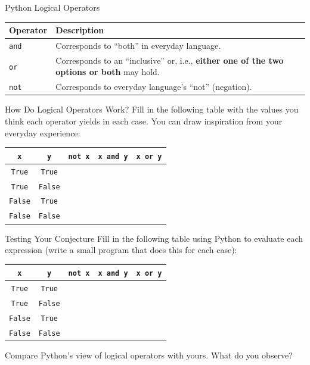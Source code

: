\documentclass[aspectratio=169, 12pt, xcolor=table]{beamer}
\begin{document}
	\begin{frame}{Python Logical Operators}
		\centering
		\begin{tabular}{lp{}}
			\toprule%
			\textbf{Operator} & \textbf{Description}\\\midrule%
			\texttt{and} & Corresponds to ``both'' in everyday language.\\%
			\texttt{or} & Corresponds to an ``inclusive'' or, i.e., \textbf{either one of the two options or both} may hold.\\%
			\texttt{not} & Corresponds to everyday language's ``not'' (negation).\\%
			\bottomrule
		\end{tabular}
	\end{frame}

	\begin{frame}{How Do Logical Operators Work?}
		Fill in the following table with the values you think each operator yields in each case. You can draw inspiration from your everyday experience:
		\vfill
		\centering{}%
		\setlength{\tabcolsep}{14pt}
		\begin{tabular}{ccccc}
			\toprule
			\texttt{x} & \texttt{y} & \texttt{\textbf{not} x} & \texttt{x \textbf{and} y} & \texttt{x \textbf{or} y}\\\midrule
			\texttt{True} & \texttt{True} & & & \\
			\texttt{True} & \texttt{False} & & & \\
			\texttt{False} & \texttt{True} & & & \\
			\texttt{False} & \texttt{False} & & & \\%
			\bottomrule
		\end{tabular}
		\vfill
	\end{frame}

	\begin{frame}{Testing Your Conjecture}
		Fill in the following table using Python to evaluate each expression (write a small program that does this for each case):
		\vfill
		\centering{}%
		\setlength{\tabcolsep}{14pt}
		\begin{tabular}{ccccc}
			\toprule
			\texttt{x} & \texttt{y} & \texttt{\textbf{not} x} & \texttt{x \textbf{and} y} & \texttt{x \textbf{or} y}\\\midrule
			\texttt{True} & \texttt{True} & & & \\
			\texttt{True} & \texttt{False} & & & \\
			\texttt{False} & \texttt{True} & & & \\
			\texttt{False} & \texttt{False} & & & \\%
			\bottomrule
		\end{tabular}
		\vfill
		\raggedright
		Compare Python's view of logical operators with yours. What do you observe?
	\end{frame}
\end{document}
